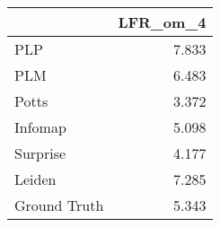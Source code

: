 \begin{tabular}{lr}
\toprule
{} & LFR_om_4 \\
\midrule
PLP          &    7.833 \\
PLM          &    6.483 \\
Potts        &    3.372 \\
Infomap      &    5.098 \\
Surprise     &    4.177 \\
Leiden       &    7.285 \\
Ground Truth &    5.343 \\
\bottomrule
\end{tabular}
